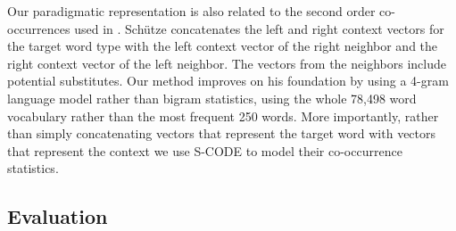\documentclass[11pt]{article}
\newcommand{\mto}{\mbox{MTO }}
\newcommand{\vm}{\mbox{VM }}
\begin{document}
Our paradigmatic representation is also related to the second order
co-occurrences used in \cite{Schutze:1995:DPT:976973.976994}.
Sch{\"u}tze concatenates the left and right context vectors for the
target word type with the left context vector of the right neighbor
and the right context vector of the left neighbor.  The vectors from
the neighbors include potential substitutes.  Our method improves on
his foundation by using a 4-gram language model rather than bigram
statistics, using the whole 78,498 word vocabulary rather than the
most frequent 250 words.  More importantly, rather than simply
concatenating vectors that represent the target word with vectors that
represent the context we use S-CODE to model their co-occurrence
statistics.

\subsection{Evaluation}
\end{document}
